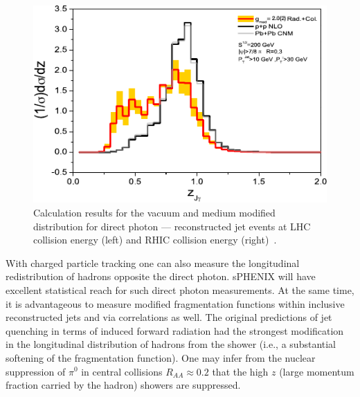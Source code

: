 \begin{figure}[!hbt]
 \begin{center}
   \hfill
   \includegraphics[width=0.48\linewidth]{figs/vitev_gammajet_RHIC}
   \caption[Calculations by Vitev et al. of the vacuum and medium
   modified distribution for direct photon triggered reconstructed jet
   events at LHC and RHIC energies]{\label{fig:vitevgammajet}
     Calculation results for the vacuum and medium modified
     distribution for direct photon --- reconstructed jet events at
     LHC collision energy (left) and RHIC collision energy
     (right)~\cite{Dai:2012am}.  }
 \end{center}
\end{figure}


With charged particle tracking one can also measure the longitudinal
redistribution of hadrons opposite the direct photon.  sPHENIX will
have excellent statistical reach for such direct photon measurements.
At the same time, it is advantageous to measure modified fragmentation
functions within inclusive reconstructed jets and via correlations as
well.  The original predictions of jet quenching in terms of induced
forward radiation had the strongest modification in the longitudinal
distribution of hadrons from the shower (i.e., a substantial softening
of the fragmentation function).  One may infer from the nuclear
suppression of $\pi^{0}$ in central \auau collisions $R_{AA} \approx
0.2$ that the high $z$ (large momentum fraction carried by the hadron)
showers are suppressed.  

